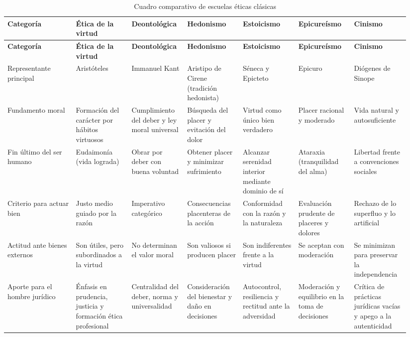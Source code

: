 \documentclass[
	spanish, %
	letterpaper, oneside
]{article}
\begin{document}
\clearpage
\pagestyle{empty}
\begin{landscape}
\thispagestyle{empty}
\begingroup
\scriptsize
\setlength{\tabcolsep}{4pt}
\renewcommand{\arraystretch}{1.35}
\begin{longtable}{@{}>{\raggedright\arraybackslash}p{0.16\linewidth}>{\raggedright\arraybackslash}p{0.13\linewidth}>{\raggedright\arraybackslash}p{0.13\linewidth}>{\raggedright\arraybackslash}p{0.13\linewidth}>{\raggedright\arraybackslash}p{0.13\linewidth}>{\raggedright\arraybackslash}p{0.13\linewidth}>{\raggedright\arraybackslash}p{0.13\linewidth}@{}}
\caption{Cuadro comparativo de escuelas éticas clásicas}\label{tab:cuadro-eticas}\\
\toprule
\textbf{Categoría} & \textbf{Ética de la virtud} & \textbf{Deontológica} & \textbf{Hedonismo} & \textbf{Estoicismo} & \textbf{Epicureísmo} & \textbf{Cinismo} \\
\midrule
\endfirsthead
\toprule
\textbf{Categoría} & \textbf{Ética de la virtud} & \textbf{Deontológica} & \textbf{Hedonismo} & \textbf{Estoicismo} & \textbf{Epicureísmo} & \textbf{Cinismo} \\
\midrule
\endhead
\bottomrule
\endfoot
\bottomrule
\endlastfoot
Representante principal & Aristóteles & Immanuel Kant & Aristipo de Cirene (tradición hedonista) & Séneca y Epicteto & Epicuro & Diógenes de Sinope \\
\midrule
Fundamento moral & Formación del carácter por hábitos virtuosos & Cumplimiento del deber y ley moral universal & Búsqueda del placer y evitación del dolor & Virtud como único bien verdadero & Placer racional y moderado & Vida natural y autosuficiente \\
\midrule
Fin último del ser humano & Eudaimonía (vida lograda) & Obrar por deber con buena voluntad & Obtener placer y minimizar sufrimiento & Alcanzar serenidad interior mediante dominio de sí & Ataraxia (tranquilidad del alma) & Libertad frente a convenciones sociales \\
\midrule
Criterio para actuar bien & Justo medio guiado por la razón & Imperativo categórico & Consecuencias placenteras de la acción & Conformidad con la razón y la naturaleza & Evaluación prudente de placeres y dolores & Rechazo de lo superfluo y lo artificial \\
\midrule
Actitud ante bienes externos & Son útiles, pero subordinados a la virtud & No determinan el valor moral & Son valiosos si producen placer & Son indiferentes frente a la virtud & Se aceptan con moderación & Se minimizan para preservar la independencia \\
\midrule
Aporte para el hombre jurídico & Énfasis en prudencia, justicia y formación ética profesional & Centralidad del deber, norma y universalidad & Consideración del bienestar y daño en decisiones & Autocontrol, resiliencia y rectitud ante la adversidad & Moderación y equilibrio en la toma de decisiones & Crítica de prácticas jurídicas vacías y apego a la autenticidad \\
\end{longtable}
\endgroup
\end{landscape}
\clearpage
\pagestyle{fancy}
\end{document}

